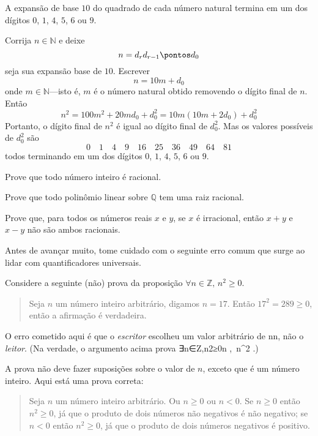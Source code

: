 \begin{proposition}
A expansão de base $10$ do quadrado de cada número natural termina em um dos dígitos $0$, $1$, $4$, $5$, $6$ ou $9$.
\end{proposition}

\begin{cproof}
Corrija $n \in \mathbb{N}$ e deixe
\[n=d_rd_{r-1} \pontos d_0\]
seja sua expansão base de $ 10$. Escrever
\[n=10m+d_0\]
onde $m \in \mathbb{N}$---isto é, $m$ é o número natural obtido removendo o dígito final de $n$. Então
\[n^2=100m^2+20md_0+d_0^2 = 10m(10m+2d_0)+d_0^2\]
Portanto, o dígito final de $n^2$ é igual ao dígito final de $d_0^2$. Mas os valores possíveis de $d_0^2$ são
\[0 \quad 1 \quad 4 \quad 9 \quad 16 \quad 25 \quad 36 \quad 49 \quad 64 \quad 81\]
todos terminando em um dos dígitos $0$, $1$, $4$, $5$, $6$ ou $9$.
\end{cproof}

\begin{exercise}
\label{exEveryIntegerIsRational}
Prove que todo número inteiro é racional.
\end{exercise}

\begin{exercise}
Prove que todo polinômio linear sobre $\mathbb{Q}$ tem uma raiz racional.
\end{exercise}

\begin{exercise}
Prove que, para todos os números reais $x$ e $y$, se $x$ é irracional, então $x+y$ e $x-y$ não são ambos racionais.
\end{exercise}

Antes de avançar muito, tome cuidado com o seguinte erro comum que surge ao lidar com quantificadores universais.

\begin{commonerror}
Considere a seguinte (não) prova da proposição $\forall n \in \mathbb{Z},\, n^2 \ge 0$.

\begin{quote}
Seja $n$ um número inteiro arbitrário, digamos $n=17$. Então $17^2 = 289 \ge 0$, então a afirmação é verdadeira.

\end{quote}

O erro cometido aqui é que o \textit{escritor} escolheu um valor arbitrário de nn, não o \textit{leitor}. (Na verdade, o argumento acima prova ∃n∈Z,n2≥0\exists n \in {},\, n^2 .)

A prova não deve fazer suposições sobre o valor de $n$, exceto que é um número inteiro. Aqui está uma prova correta:

\begin{quote}
Seja $n$ um número inteiro arbitrário. Ou $n \ge 0$ ou $n < 0$. Se $n \ge 0$ então $n^2 \ge 0$, já que o produto de dois números não negativos é não negativo; se $n<0$ então $n^2 \ge 0$, já que o produto de dois números negativos é positivo.
\end{quote}
\end{commonerror}

